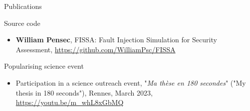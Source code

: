 \begin{frame}[allowframebreaks]{Publications}
    \begin{block}{Source code}
        \begin{itemize}
            \item {\footnotesize \textbf{William Pensec}, FISSA: Fault Injection Simulation for Security Assessment, \url{https://github.com/WilliamPsc/FISSA}}
        \end{itemize}
    \end{block}

    \begin{block}{Popularising science event}
        \begin{itemize}
            \item {\footnotesize Participation in a science outreach event, "\textit{Ma thèse en 180 secondes}" ("My thesis in 180 seconds"), Rennes, March 2023, \url{https://youtu.be/m_whL8xGbMQ}}
        \end{itemize}
    \end{block}
\end{frame}
\begin{frame}{}
    \backpage
\end{frame}
